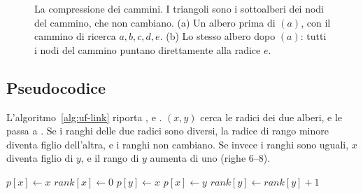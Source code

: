 \begin{figure}[htbp]
\centering
{}
\caption{La compressione dei cammini. I triangoli sono i sottoalberi dei nodi del cammino, che non cambiano. (a) Un albero prima di \FindSet$(a)$, con il cammino di ricerca $a, b, c, d, e$. (b) Lo stesso albero dopo \FindSet$(a)$: tutti i nodi del cammino puntano direttamente alla radice $e$.}
\label{fig:uf-compressione}
\end{figure}

\subsection{Pseudocodice}\label{sec:uf-pseudocodice}
L'algoritmo~\ref{alg:uf-link} riporta \MakeSet{}, \Link{} e \Union{}. \Union$(x,y)$ cerca le radici dei due alberi, e le passa a \Link{}. Se i ranghi delle due radici sono diversi, la radice di rango minore diventa figlio dell'altra, e i ranghi non cambiano. Se invece i ranghi sono uguali, $x$ diventa figlio di $y$, e il rango di $y$ aumenta di uno (righe 6--8).

\begin{algorithm}[!htb]
\caption{La creazione di un insieme, e l'unione di due insiemi con l'unione per ranghi. \Link{} riceve due radici.}\label{alg:uf-link}
\begin{algorithmic}[1]
  \State $p[x] \gets x$
  \State $\mathit{rank}[x] \gets 0$
\EndProcedure
\Statex
{}
    \State $p[y] \gets x$
  \Else
    \State $p[x] \gets y$
      \State $\mathit{rank}[y] \gets \mathit{rank}[y] + 1$
    \EndIf
  \EndIf
\EndProcedure
\Statex
{}
  \State {}
\EndProcedure
\end{algorithmic}
\end{algorithm}

